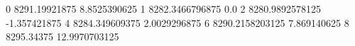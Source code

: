 0 8291.19921875 8.8525390625
1 8282.3466796875 0.0
2 8280.9892578125 -1.357421875
4 8284.349609375 2.0029296875
6 8290.2158203125 7.869140625
8 8295.34375 12.9970703125
